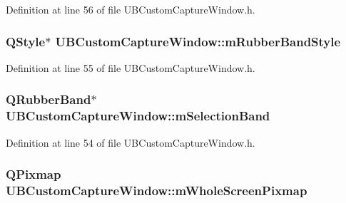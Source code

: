 Definition at line 56 of file U\-B\-Custom\-Capture\-Window.\-h.

\hypertarget{class_u_b_custom_capture_window_a2123422c01b98254eee4ad218c22c80e}{
\subsubsection[{m\-Rubber\-Band\-Style}]{\setlength{\rightskip}{0pt plus 5cm}Q\-Style$\ast$ U\-B\-Custom\-Capture\-Window\-::m\-Rubber\-Band\-Style\hspace{0.3cm}{\ttfamily [protected]}}}\label{d1/d5d/class_u_b_custom_capture_window_a2123422c01b98254eee4ad218c22c80e}


Definition at line 55 of file U\-B\-Custom\-Capture\-Window.\-h.

\hypertarget{class_u_b_custom_capture_window_a242415d0c985fcaec2f796a742f3fe0a}{
\subsubsection[{m\-Selection\-Band}]{\setlength{\rightskip}{0pt plus 5cm}Q\-Rubber\-Band$\ast$ U\-B\-Custom\-Capture\-Window\-::m\-Selection\-Band\hspace{0.3cm}{\ttfamily [protected]}}}\label{d1/d5d/class_u_b_custom_capture_window_a242415d0c985fcaec2f796a742f3fe0a}


Definition at line 54 of file U\-B\-Custom\-Capture\-Window.\-h.

\hypertarget{class_u_b_custom_capture_window_ae47c19f393caad44319b55c30db43e40}{
\subsubsection[{m\-Whole\-Screen\-Pixmap}]{\setlength{\rightskip}{0pt plus 5cm}Q\-Pixmap U\-B\-Custom\-Capture\-Window\-::m\-Whole\-Screen\-Pixmap\hspace{0.3cm}{\ttfamily [protected]}}}\label{d1/d5d/class_u_b_custom_capture_window_ae47c19f393caad44319b55c30db43e40}


